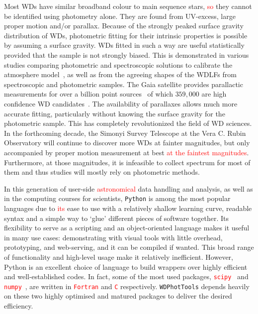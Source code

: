 \documentclass[fleqn,usenatbib]{rasti}
\begin{document}
Most WDs have similar broadband colour to main sequence stars,
\textcolor{red}{so} they cannot be identified using photometry alone. They are
found from UV-excess, large proper motion and/or parallax. Because of the
strongly peaked surface gravity distribution of WDs, photometric fitting for
their intrinsic properties is possible by assuming a surface gravity. WDs
fitted in such a way are useful statistically provided that the sample is not
strongly biased. This is demonstrated in various studies comparing photometric
and spectroscopic solutions to calibrate the atmosphere
model~\citep{2019ApJ...871..169G, 2019ApJ...882..106G}, as well as from the
agreeing shapes of the WDLFs from spectroscopic and photometric samples. The
Gaia satellite provides parallactic measurements for over a billion point
sources~\citep{2021A&A...649A...1G, 2021AJ....161..147B} of which $359,000$
are high confidence WD candidates~\citep[][hereafter, GF21]{2021MNRAS.508.3877G}.
The availability of parallaxes allows much more accurate fitting, particularly
without knowing the surface gravity for the photometric sample. This has
completely  revolutionized the field of WD sciences. In the forthcoming decade,
the Simonyi Survey Telescope at the Vera C. Rubin Observatory will continue to
discover more WDs at fainter magnitudes, but only accompanied by proper
motion measurement at best \textcolor{red}{at the faintest magnitudes}.
Furthermore, at those magnitudes, it is infeasible to collect spectrum for most
of them and thus studies will mostly rely on photometric methods.

In this generation of user-side \textcolor{red}{astronomical} data handling and
analysis, as well as in the computing courses for scientists, \texttt{Python} is
among the most popular languages due to \textcolor{red}{its} ease to use with a
relatively shallow learning curve, readable syntax and a simple way to `glue'
different pieces of software together. Its flexibility to serve as a scripting
and an object-oriented language makes it useful in many use cases: demonstrating
with visual tools with little overhead, prototyping, and web-serving, and it can
be compiled if wanted. This broad range of functionality and high-level usage
make it relatively inefficient. However, Python is an excellent choice of
language to build wrappers over highly efficient and well-established codes. In
fact, some of the most used packages,
\textcolor{red}{\texttt{scipy}}~\citep{2020NatMe..17..261V} and
\textcolor{red}{\texttt{numpy}}~\citep{2020Natur.585..357H}, are written in
\textcolor{red}{\texttt{Fortran}} and \textcolor{red}{\texttt{C}} respectively.
\texttt{WDPhotTools} depends heavily on these two highly optimised and matured
packages to deliver the desired efficiency.
\end{document}
